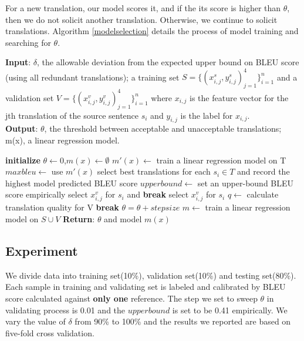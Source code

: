 \documentclass[11pt,letterpaper]{article}
\begin{document}
For a new translation, our model scores it, and if the its score is higher than $\theta$, then we do not solicit another translation. Otherwise, we continue to solicit translations.  Algorithm \ref{modelselection} details the process of model training and searching for $\theta$. 
\begin{algorithm} [h!]
\caption{}\label{modelselection}
\textbf{Input}: $\delta$, the allowable deviation from the expected upper bound on BLEU score (using all redundant translations); a training set $S = \{(x^{s}_{i,j},y^{s}_{i,j})_{j=1}^{4}\}_{i=1}^n$ and a validation set $V = \{(x^{v}_{i,j},y^{v}_{i,j})_{j=1}^{4}\}_{i=1}^n$ where $x_{i,j}$ is the feature vector for the jth translation of the source sentence $s_{i}$ and $y_{i,j}$ is the label for $x_{i,j}$.\\
\textbf{Output}: $\theta$, the threshold between acceptable and unacceptable translations; m(x), a linear regression model. 
\begin{algorithmic}[1]
\State \textbf{initialize} $\theta \leftarrow 0$,$m(x)\leftarrow \emptyset$ 
\State $m'(x)\leftarrow$ train a linear regression model on T
\State $maxbleu \leftarrow$ use $m'(x)$ select best translations for each $s_i \in T$ and record the highest model predicted BLEU score
\State $upperbound \leftarrow$ set an upper-bound BLEU score empirically
             select $x^{v}_{i,j}$ for $s_i$ and \textbf{break}
\EndIf
{} select $x^{v}_{i,j}$ for $s_i$
\EndIf
\EndFor
\EndFor
\State $q \leftarrow$ calculate translation quality for V
 \textbf{break}
\Else \text{  } $\theta = \theta + stepsize$
\EndIf
\EndWhile
\State $m \leftarrow$ train a linear regression model on $S \cup V$
\State \textbf{Return}: $\theta$ and model $m(x)$
\end{algorithmic}
\end{algorithm}


\subsection{Experiment}
 We divide data into training set(10\%), validation set(10\%) and testing set(80\%). Each sample in training and validating set is labeled and calibrated by BLEU score calculated against \textbf{only one} reference. The step we set to sweep $\theta$ in validating process is 0.01 and the $upperbound$ is set to be 0.41 empirically. We vary the value of $\delta$ from 90\% to 100\% and the results we reported are based on five-fold cross validation.
\end{document}

